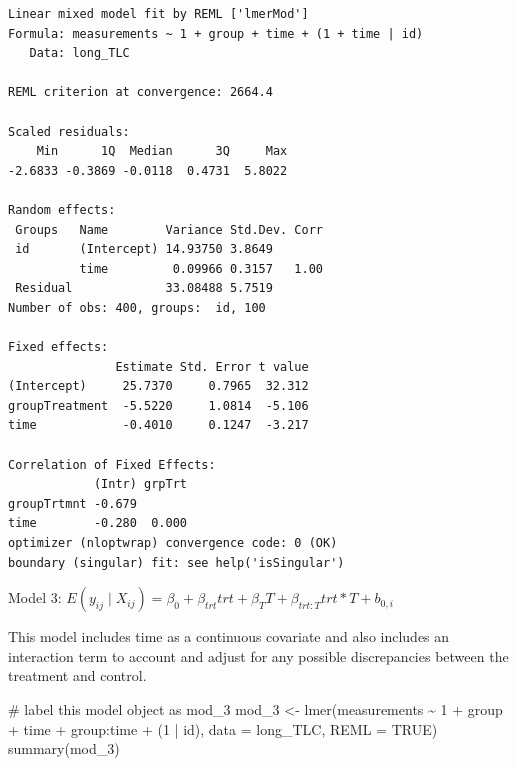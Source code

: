\documentclass[
  letterpaper,
  DIV=11,
  numbers=noendperiod]{scrreprt}
\newenvironment{Shaded}{\begin{snugshade}}{\end{snugshade}}
\newcommand{\AttributeTok}[1]{\textcolor[rgb]{0.40,0.45,0.13}{#1}}
\newcommand{\CommentTok}[1]{\textcolor[rgb]{0.37,0.37,0.37}{#1}}
\newcommand{\ConstantTok}[1]{\textcolor[rgb]{0.56,0.35,0.01}{#1}}
\newcommand{\DecValTok}[1]{\textcolor[rgb]{0.68,0.00,0.00}{#1}}
\newcommand{\FunctionTok}[1]{\textcolor[rgb]{0.28,0.35,0.67}{#1}}
\newcommand{\NormalTok}[1]{\textcolor[rgb]{0.00,0.23,0.31}{#1}}
\newcommand{\OtherTok}[1]{\textcolor[rgb]{0.00,0.23,0.31}{#1}}
\newcommand{\SpecialCharTok}[1]{\textcolor[rgb]{0.37,0.37,0.37}{#1}}
\begin{document}
\begin{verbatim}
Linear mixed model fit by REML ['lmerMod']
Formula: measurements ~ 1 + group + time + (1 + time | id)
   Data: long_TLC

REML criterion at convergence: 2664.4

Scaled residuals: 
    Min      1Q  Median      3Q     Max 
-2.6833 -0.3869 -0.0118  0.4731  5.8022 

Random effects:
 Groups   Name        Variance Std.Dev. Corr
 id       (Intercept) 14.93750 3.8649       
          time         0.09966 0.3157   1.00
 Residual             33.08488 5.7519       
Number of obs: 400, groups:  id, 100

Fixed effects:
               Estimate Std. Error t value
(Intercept)     25.7370     0.7965  32.312
groupTreatment  -5.5220     1.0814  -5.106
time            -0.4010     0.1247  -3.217

Correlation of Fixed Effects:
            (Intr) grpTrt
groupTrtmnt -0.679       
time        -0.280  0.000
optimizer (nloptwrap) convergence code: 0 (OK)
boundary (singular) fit: see help('isSingular')
\end{verbatim}

\begin{center}
Model 3: $E(y_{ij} \mid X_{ij}) = \beta_0 + \beta_{trt}trt + \beta_{T}T + \beta_{trt:T}trt*T + b_{0,i}$
\end{center}

This model includes time as a continuous covariate and also includes an
interaction term to account and adjust for any possible discrepancies
between the treatment and control.

\begin{Shaded}
\begin{Highlighting}[]
\CommentTok{\# label this model object as mod\_3}
\NormalTok{mod\_3 }\OtherTok{\textless{}{-}} \FunctionTok{lmer}\NormalTok{(measurements }\SpecialCharTok{\textasciitilde{}} \DecValTok{1} \SpecialCharTok{+}\NormalTok{ group }\SpecialCharTok{+}\NormalTok{ time }\SpecialCharTok{+}\NormalTok{ group}\SpecialCharTok{:}\NormalTok{time }\SpecialCharTok{+}\NormalTok{ (}\DecValTok{1} \SpecialCharTok{|}\NormalTok{ id), }\AttributeTok{data =}\NormalTok{ long\_TLC,}
    \AttributeTok{REML =} \ConstantTok{TRUE}\NormalTok{)}
\FunctionTok{summary}\NormalTok{(mod\_3)}
\end{Highlighting}
\end{Shaded}
\end{document}
